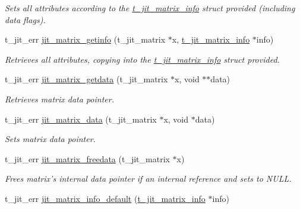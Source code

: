 \begin{DoxyCompactItemize}
\begin{DoxyCompactList}\small\item\em Sets all attributes according to the \hyperlink{structt__jit__matrix__info}{t\_\-jit\_\-matrix\_\-info} struct provided (including data flags). \item\end{DoxyCompactList}\item 
t\_\-jit\_\-err \hyperlink{group__matrixmod_ga52060a5a58fb6503fa66e40336df2d2c}{jit\_\-matrix\_\-getinfo} (t\_\-jit\_\-matrix $\ast$x, \hyperlink{structt__jit__matrix__info}{t\_\-jit\_\-matrix\_\-info} $\ast$info)
\begin{DoxyCompactList}\small\item\em Retrieves all attributes, copying into the \hyperlink{structt__jit__matrix__info}{t\_\-jit\_\-matrix\_\-info} struct provided. \item\end{DoxyCompactList}\item 
t\_\-jit\_\-err \hyperlink{group__matrixmod_ga15e9e2b55f6ce23d2c488d8b2bf8b57b}{jit\_\-matrix\_\-getdata} (t\_\-jit\_\-matrix $\ast$x, void $\ast$$\ast$data)
\begin{DoxyCompactList}\small\item\em Retrieves matrix data pointer. \item\end{DoxyCompactList}\item 
t\_\-jit\_\-err \hyperlink{group__matrixmod_ga2c46ae2df38dcc4be2166c05710ef42a}{jit\_\-matrix\_\-data} (t\_\-jit\_\-matrix $\ast$x, void $\ast$data)
\begin{DoxyCompactList}\small\item\em Sets matrix data pointer. \item\end{DoxyCompactList}\item 
t\_\-jit\_\-err \hyperlink{group__matrixmod_gaa3dcbf132ba94af59d39ec1b0a20aba2}{jit\_\-matrix\_\-freedata} (t\_\-jit\_\-matrix $\ast$x)
\begin{DoxyCompactList}\small\item\em Frees matrix's internal data pointer if an internal reference and sets to NULL. \item\end{DoxyCompactList}\item 
t\_\-jit\_\-err \hyperlink{group__matrixmod_ga9c068d7781425345e99576a1955366af}{jit\_\-matrix\_\-info\_\-default} (\hyperlink{structt__jit__matrix__info}{t\_\-jit\_\-matrix\_\-info} $\ast$info)
$$
\end{DoxyCompactItemize}
